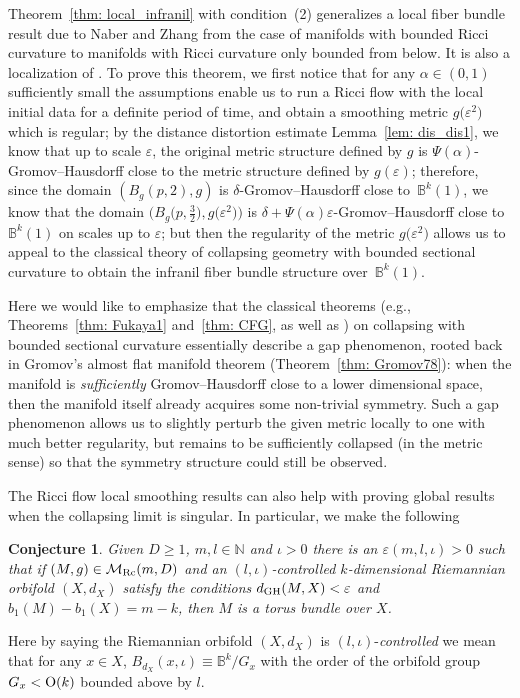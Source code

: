 \documentclass[10pt,a4paper]{amsart}
\numberwithin{equation}{section}
\newtheorem{Conjecture}[Theorem]{Conjecture}
\begin{document}
Theorem~\ref{thm: local_infranil} with condition~(2) generalizes a local fiber
bundle result due to Naber and Zhang \cite[Proposition~6.6]{NaberZhang} from
the case of manifolds with bounded Ricci curvature to manifolds with Ricci
curvature only bounded from below. It is also a localization of \cite[Theorem~B]{HKRX18}. To prove this theorem, we first notice that for any $\alpha \in
(0,1)$ sufficiently small the assumptions enable us to run a Ricci flow with
the local initial data for a definite period of time, and obtain a smoothing
metric $g\big(\varepsilon^2\big)$ which is regular; by the distance distortion estimate
Lemma~\ref{lem: dis_dis1}, we know that up to scale $\varepsilon$, the original
metric structure defined by $g$ is $\Psi(\alpha)$-Gromov--Hausdorff close to the
metric structure defined by $g(\varepsilon)$; therefore, since the domain
$(B_g(p,2),g)$ is $\delta$-Gromov--Hausdorff close to~$\mathbb{B}^k(1)$, we know
that the domain $\big(B_g\big(p,\frac{3}{2}\big),g\big(\varepsilon^2\big)\big)$ is
$\delta+\Psi(\alpha)\varepsilon$-Gromov--Hausdorff close to~$\mathbb{B}^k(1)$ on
scales up to $\varepsilon$; but then the regularity of the metric
$g\big(\varepsilon^2\big)$ allows us to appeal to the classical theory of collapsing
geometry \cite[Theorem~2.6]{CFG92} with bounded sectional curvature to obtain
the infranil fiber bundle structure over~$\mathbb{B}^k(1)$.

Here we would like to emphasize that the classical theorems (e.g.,
Theorems~\ref{thm: Fukaya1} and~\ref{thm: CFG}, as well as \cite[Theorem~2.6]{CFG92}) on collapsing with bounded sectional curvature essentially
describe a gap phenomenon, rooted back in Gromov's almost flat manifold theorem
(Theorem~\ref{thm: Gromov78}): when the manifold is \emph{sufficiently}
Gromov--Hausdorff close to a lower dimensional space, then the manifold itself
already acquires some non-trivial symmetry. Such a gap phenomenon allows us to
slightly perturb the given metric locally to one with much better regularity,
but remains to be sufficiently collapsed (in the metric sense) so that the
symmetry structure could still be observed.

The Ricci flow local smoothing results can also help with proving global results
when the collapsing limit is singular. In particular, we make the following
\begin{Conjecture}
Given $D\ge 1$, $m,l\in \mathbb{N}$ and $\iota>0$ there is an
$\varepsilon(m,l,\iota)>0$ such that if $(M,g)\in \mathcal{M}_{\rm Rc}(m,D)$ and an
$(l,\iota)$-controlled $k$-dimensional Riemannian orbifold $(X,d_X)$ satisfy the
conditions $d_{\rm GH}(M,X)<\varepsilon$ and $b_1(M)-b_1(X)=m-k$, then $M$ is a
torus bundle over $X$.
\end{Conjecture}
Here by saying the Riemannian orbifold $(X,d_X)$ is
$(l,\iota)$-\emph{controlled} we mean that for any $x\in X$,
$B_{d_X}(x,\iota)\equiv \mathbb{B}^k\slash G_x$ with the order
of the orbifold group $G_x<{\rm O}(k)$ bounded above by $l$.
\end{document}
